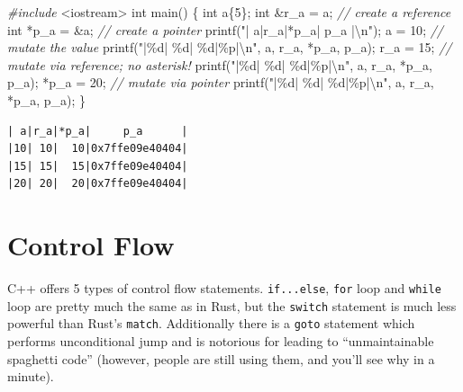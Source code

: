 \documentclass[
]{book}
\newenvironment{Shaded}{\begin{snugshade}}{\end{snugshade}}
\newcommand{\CommentTok}[1]{\textcolor[rgb]{0.56,0.35,0.01}{\textit{#1}}}
\newcommand{\DataTypeTok}[1]{\textcolor[rgb]{0.13,0.29,0.53}{#1}}
\newcommand{\DecValTok}[1]{\textcolor[rgb]{0.00,0.00,0.81}{#1}}
\newcommand{\ImportTok}[1]{#1}
\newcommand{\NormalTok}[1]{#1}
\newcommand{\PreprocessorTok}[1]{\textcolor[rgb]{0.56,0.35,0.01}{\textit{#1}}}
\newcommand{\SpecialCharTok}[1]{\textcolor[rgb]{0.00,0.00,0.00}{#1}}
\newcommand{\StringTok}[1]{\textcolor[rgb]{0.31,0.60,0.02}{#1}}
\begin{document}
\begin{Shaded}
\begin{Highlighting}[]
\PreprocessorTok{\#include }\ImportTok{\textless{}iostream\textgreater{}}
\DataTypeTok{int}\NormalTok{ main()}
\NormalTok{\{}
    \DataTypeTok{int}\NormalTok{ a\{}\DecValTok{5}\NormalTok{\};}
    \DataTypeTok{int}\NormalTok{ \&r\_a = a;  }\CommentTok{// create a reference}
    \DataTypeTok{int}\NormalTok{ *p\_a = \&a; }\CommentTok{// create a pointer}
\NormalTok{    printf(}\StringTok{"| a|r\_a|*p\_a|     p\_a      |}\SpecialCharTok{\textbackslash{}n}\StringTok{"}\NormalTok{);}
\NormalTok{    a = }\DecValTok{10}\NormalTok{; }\CommentTok{// mutate the value}
\NormalTok{    printf(}\StringTok{"|}\SpecialCharTok{\%d}\StringTok{| }\SpecialCharTok{\%d}\StringTok{|  }\SpecialCharTok{\%d}\StringTok{|}\SpecialCharTok{\%p}\StringTok{|}\SpecialCharTok{\textbackslash{}n}\StringTok{"}\NormalTok{, a, r\_a, *p\_a, p\_a);}
\NormalTok{    r\_a = }\DecValTok{15}\NormalTok{; }\CommentTok{// mutate via reference; no asterisk!}
\NormalTok{    printf(}\StringTok{"|}\SpecialCharTok{\%d}\StringTok{| }\SpecialCharTok{\%d}\StringTok{|  }\SpecialCharTok{\%d}\StringTok{|}\SpecialCharTok{\%p}\StringTok{|}\SpecialCharTok{\textbackslash{}n}\StringTok{"}\NormalTok{, a, r\_a, *p\_a, p\_a);}
\NormalTok{    *p\_a = }\DecValTok{20}\NormalTok{; }\CommentTok{// mutate via pointer}
\NormalTok{    printf(}\StringTok{"|}\SpecialCharTok{\%d}\StringTok{| }\SpecialCharTok{\%d}\StringTok{|  }\SpecialCharTok{\%d}\StringTok{|}\SpecialCharTok{\%p}\StringTok{|}\SpecialCharTok{\textbackslash{}n}\StringTok{"}\NormalTok{, a, r\_a, *p\_a, p\_a);}
\NormalTok{\}}
\end{Highlighting}
\end{Shaded}

\begin{verbatim}
| a|r_a|*p_a|     p_a      |
|10| 10|  10|0x7ffe09e40404|
|15| 15|  15|0x7ffe09e40404|
|20| 20|  20|0x7ffe09e40404|
\end{verbatim}

\hypertarget{control-flow}{%
\section{Control Flow}\label{control-flow}}

C++ offers 5 types of control flow statements. \texttt{if...else}, \texttt{for} loop and \texttt{while} loop are pretty much the same as in Rust, but the \texttt{switch} statement is much less powerful than Rust's \texttt{match}. Additionally there is a \texttt{goto} statement which performs unconditional jump and is notorious for leading to ``unmaintainable spaghetti code'' (however, people are still using them, and you'll see why in a minute).
\end{document}
